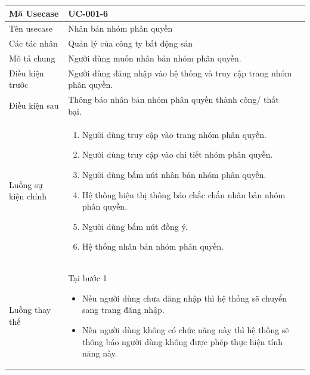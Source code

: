 \documentclass[12pt,a4paper]{article}
\begin{document}
    \begin{table}[H]
        \centering
        \begin{tabular}{|p{3.5cm}|p{11.5cm}|c|}
            \hline
            Mã Usecase      & UC-001-6                                                             \\
            \hline
            Tên usecase     & Nhân bản nhóm phân quyền                                             \\
            \hline
            Các tác nhân    & Quản lý của công ty bất động sản                                     \\
            \hline
            Mô tả chung     & Người dùng muốn nhân bản nhóm phân quyền.                            \\
            \hline
            Điều kiện trước & Người dùng đăng nhập vào hệ thống và truy cập trang nhóm phân quyền. \\
            \hline
            Điều kiện sau   & Thông báo nhân bản nhóm phân quyền thành công/ thất bại.             \\
            \hline
            Luồng sự kiện chính & \vspace{-.8cm}\begin{enumerate}
                                                    \item Người dùng truy cập vào trang nhóm phân quyền.
                                                    \item Người dùng truy cập vào chi tiết nhóm phân quyền.
                                                    \item  Người dùng bấm nút nhân bản nhóm phân quyền.
                                                    \item  Hệ thống hiện thị thông báo chắc chắn nhân bản nhóm phân quyền.
                                                    \item  Người dùng bấm nút đồng ý.
                                                    \item Hệ thống nhân bản nhóm phân quyền.
            \end{enumerate}
            \\
            \hline
            Luồng thay thế & Tại bước 1\newline
            \vspace{-.8cm}\begin{itemize}
                              \item Nếu người dùng chưa đăng nhập thì hệ thống sẽ chuyển sang trang đăng nhập.
                              \item Nếu người dùng không có chức năng này thì hệ thống sẽ thông báo người dùng không được phép thực hiện tính năng này.
            \end{itemize}


\end{tabular}
\end{table}
\end{document}
